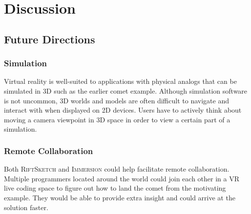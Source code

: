 \documentclass[conference]{IEEEtran}
\begin{document}

\section{Discussion}

\subsection{Future Directions}

\subsubsection{Simulation}

Virtual reality is well-suited to applications with physical analogs that can be simulated in 3D such as the earlier comet example. 
Although simulation software is not uncommon, 3D worlds and models are often difficult to navigate and interact with when displayed on 2D devices. 
Users have to actively think about moving a camera viewpoint in 3D space in order to view a certain part of a simulation. 



\subsubsection{Remote Collaboration}

Both \textsc{RiftSketch} and \textsc{Immersion} could help facilitate remote collaboration.
Multiple programmers located around the world could join each other in a VR live coding space to figure out how to land the comet from the motivating example.
They would be able to provide extra insight and could arrive at the solution faster.
\end{document}
